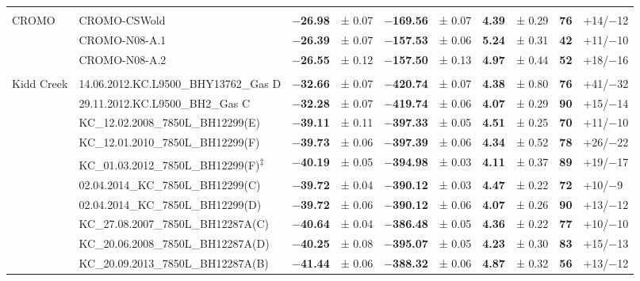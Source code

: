\begin{landscape}
\begin{ThreePartTable}
\begin{longtable}[]{ll r@{\hspace{0.2em}}l r@{\hspace{0.2em}}l r@{\hspace{0.2em}}l r@{\hspace{0.2em}}l}
			\tabularnewline
			\tabularnewline
			CROMO & CROMO-CSWold & \textbf{$-$26.98} & ± 0.07 & \textbf{$-$169.56} & ±
			0.07 & \textbf{4.39} & ± 0.29 & \textbf{76} & +14/$-$12
			\tabularnewline
			& CROMO-N08-A.1 & \textbf{$-$26.39} & ± 0.07 & \textbf{$-$157.53} & ± 0.06
			 & \textbf{5.24} & ± 0.31 & \textbf{42} & +11/$-$10 \tabularnewline
			& CROMO-N08-A.2 & \textbf{$-$26.55} & ± 0.12 & \textbf{$-$157.50} & ± 0.13
			 & \textbf{4.97} & ± 0.44 & \textbf{52} & +18/$-$16 \tabularnewline
			 
			\tabularnewline
			Kidd Creek & 14.06.2012.KC.L9500\_BHY13762\_Gas D & \textbf{$-$32.66} & ±
			0.07 & \textbf{$-$420.74} & ± 0.07 & \textbf{4.38} & ± 0.80 &
			\textbf{76} & +41/$-$32 \tabularnewline
			& 29.11.2012.KC.L9500\_BH2\_Gas C & \textbf{$-$32.28} & ± 0.07 &
			\textbf{$-$419.74} & ± 0.06 & \textbf{4.07} & ± 0.29 & \textbf{90} &
			+15/$-$14 \tabularnewline
			& KC\_12.02.2008\_7850L\_BH12299(E) & \textbf{$-$39.11} & ± 0.11 &
			\textbf{$-$397.33} & ± 0.05 & \textbf{4.51} & ± 0.25 & \textbf{70} &
			+11/$-$10 \tabularnewline
			& KC\_12.01.2010\_7850L\_BH12299(F) & \textbf{$-$39.73} & ± 0.06 &
			\textbf{$-$397.39} & ± 0.06 & \textbf{4.34} & ± 0.52 & \textbf{78} &
			+26/$-$22 \tabularnewline
			& KC\_01.03.2012\_7850L\_BH12299(F)\textsuperscript{‡} & \textbf{$-$40.19}
			& ± 0.05 & \textbf{$-$394.98} & ± 0.03 & \textbf{4.11} & ± 0.37 &
			\textbf{89} & +19/$-$17 \tabularnewline
			& 02.04.2014\_KC\_7850L\_BH12299(C) & \textbf{$-$39.72} & ± 0.04 &
			\textbf{$-$390.12} & ± 0.03 & \textbf{4.47} & ± 0.22 & \textbf{72} &
			+10/$-$9 \tabularnewline
			& 02.04.2014\_KC\_7850L\_BH12299(D) & \textbf{$-$39.72} & ± 0.06 &
			\textbf{$-$390.12} & ± 0.06 & \textbf{4.07} & ± 0.26 & \textbf{90} &
			+13/$-$12 \tabularnewline
			& KC\_27.08.2007\_7850L\_BH12287A(C) & \textbf{$-$40.64} & ± 0.04 &
			\textbf{$-$386.48} & ± 0.05 & \textbf{4.36} & ± 0.22 & \textbf{77} &
			+10/$-$10 \tabularnewline
			& KC\_20.06.2008\_7850L\_BH12287A(D) & \textbf{$-$40.25} & ± 0.08 &
			\textbf{$-$395.07} & ± 0.05 & \textbf{4.23} & ± 0.30 & \textbf{83} &
			+15/$-$13 \tabularnewline
			& KC\_20.09.2013\_7850L\_BH12287A(B) & \textbf{$-$41.44} & ± 0.06 &
			\textbf{$-$388.32} & ± 0.06 & \textbf{4.87} & ± 0.32 & \textbf{56} &
			+13/$-$12 \tabularnewline
			

\end{longtable}
\end{ThreePartTable}
\end{landscape}
